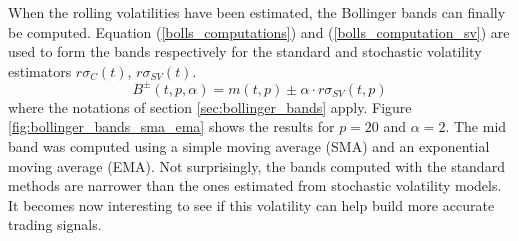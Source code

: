 \documentclass[11pt,a4,twosided,singlespacing,titlepagenumber=on]{scrreprt}
\numberwithin{equation}{chapter} %
\theoremstyle{remark}
\begin{document}
When the rolling volatilities have been estimated, the Bollinger bands can finally be computed. Equation (\ref{bolls_computations}) and (\ref{bolls_computation_sv}) are used to form the bands respectively for the standard and stochastic volatility estimators $r\sigma_C(t)$, $r\sigma_{SV}(t)$.
\begin{equation}
\label{bolls_computation_sv}
B^\pm(t,p,\alpha) = m(t,p) \pm \alpha \cdot r\sigma_{SV}(t,p)
\end{equation}
where the notations of section \ref{sec:bollinger_bands} apply. Figure \ref{fig:bollinger_bands_sma_ema} shows the results for $p=20$ and $\alpha = 2$. The mid band was computed using a simple moving average (SMA) and an exponential moving average (EMA). Not surprisingly, the bands computed with the standard methods are narrower than the ones estimated from stochastic volatility models. It becomes now interesting to see if this volatility can help build more accurate trading signals.
\end{document}
